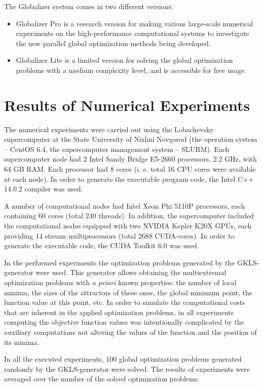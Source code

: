 \documentclass{aims}
\theoremstyle{definition}
\begin{document}
\par
The Globalizer system comes in two different versions:
\begin{itemize}
  \item Globalizer Pro is a research version for making various large-scale numerical experiments on the high-performance computational systems to investigate the new parallel global optimization methods being developed.
  \item Globalizer Lite is a limited version for solving the global optimization problems with a medium complexity level, and is accessible for free usage.
\end{itemize}

\section{Results of Numerical Experiments}
\label{sec:experiments}
The numerical experiments were carried out using the Lobachevsky supercomputer at
the State University of Nizhni Novgorod (the operation system – CentOS 6.4, the
supercomputer management system – SLURM). Each supercomputer node had 2 Intel Sandy Bridge
E5-2660 processors, 2.2 GHz, with 64 GB RAM. Each processor had 8 cores (i. e. total
16 CPU cores were available at each node). In order to generate the executable program code, the Intel C++ 14.0.2 compiler was used.
\par
A number of computational nodes had Intel Xeon Phi 5110P processors, each containing 60 cores
(total 240 threads). In addition, the supercomputer included the computational nodes equipped
with two NVIDIA Kepler K20X GPUs, each providing 14 stream multiprocessors (total 2688 CUDA-cores). In order to generate the executable code, the CUDA Toolkit 6.0 was used.
\par
In the performed experiments the optimization problems generated by the GKLS-generator
\cite{gavianoKvasovLeraSergeev2003} were used. This generator allows obtaining the multiextremal optimization
problems with \textit{a priori} known properties: the number of local minima, the sizes of the attractors of these ones, the global minimum point, the function value at this point, etc. In order to simulate the computational costs that are inherent in the applied optimization problems, in all experiments computing the objective function values was intentionally complicated by the auxiliary computations not altering the values of the function and the position of its minima.
\par
In all the executed experiments, 100 global optimization problems generated randomly by the GKLS-generator were solved. The results of experiments were averaged over the number of the solved optimization problems.
\end{document}

